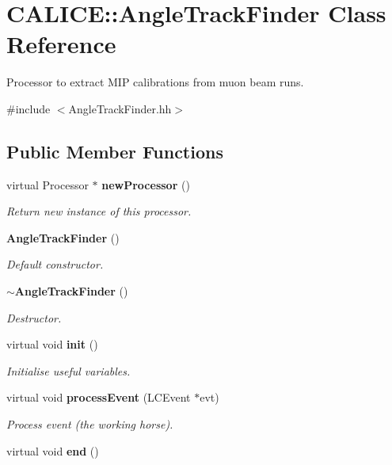 \section{CALICE::AngleTrackFinder Class Reference}
\label{classCALICE_1_1AngleTrackFinder}


Processor to extract MIP calibrations from muon beam runs.  


{\ttfamily \#include $<$AngleTrackFinder.hh$>$}\subsection*{Public Member Functions}
\begin{DoxyCompactItemize}
\item 
virtual Processor $\ast$ {\bf newProcessor} ()\label{classCALICE_1_1AngleTrackFinder_af929a19d0689fbf8f946988797daff4a}

\begin{DoxyCompactList}\small\item\em Return new instance of this processor. \item\end{DoxyCompactList}\item 
{\bf AngleTrackFinder} ()\label{classCALICE_1_1AngleTrackFinder_a74cdcf69ca7ef1072ccdd5ea7d9ae551}

\begin{DoxyCompactList}\small\item\em Default constructor. \item\end{DoxyCompactList}\item 
{\bf $\sim$AngleTrackFinder} ()\label{classCALICE_1_1AngleTrackFinder_acf657623bf1eff4c45b4af704f519ca3}

\begin{DoxyCompactList}\small\item\em Destructor. \item\end{DoxyCompactList}\item 
virtual void {\bf init} ()\label{classCALICE_1_1AngleTrackFinder_a994a129403fc067c93e4a37545c79499}

\begin{DoxyCompactList}\small\item\em Initialise useful variables. \item\end{DoxyCompactList}\item 
virtual void {\bf processEvent} (LCEvent $\ast$evt)
\begin{DoxyCompactList}\small\item\em Process event (the working horse). \item\end{DoxyCompactList}\item 
virtual void {\bf end} ()\label{classCALICE_1_1AngleTrackFinder_a4e7d844d0f42764d16f9f66a3f887f4c}


\end{DoxyCompactItemize}
